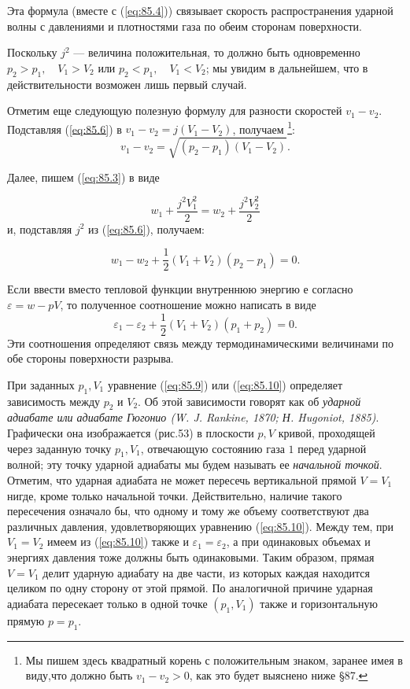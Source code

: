 Эта формула (вместе с (\ref{eq:85.4})) связывает скорость распространения ударной волны с давлениями и плотностями газа по обеим сторонам поверхности.


Поскольку $j^2$ --- величина положительная, то должно быть одновременно $p_2 >
p_1, \quad V_1 > V_2$ или $p_2 < p_1, \quad V_1 < V_2$; мы увидим в дальнейшем, что в действительности возможен лишь первый случай.

Отметим еще следующую полезную формулу для разности скоростей $v_1 - v_2$.
Подставляя (\ref{eq:85.6}) в $v_1 - v_2 = j(V_1 - V_2)$, получаем \footnote{
Мы пишем здесь квадратный корень с положительным знаком, заранее имея в виду,что должно быть $v_1-v_2>0$, как это будет выяснено ниже \S 87.
}:
\begin{equation}
	\label{eq:85.7}
	v_1 - v_2 = \sqrt{(p_2-p_1)(V_1-V_2)}.
\end{equation}

Далее, пишем (\ref{eq:85.3}) в виде


\begin{equation}
	\label{eq:85.8}
	w_1 + \frac{j^2 V^2_1}{2} = w_2 + \frac{j^2 V^2_2}{2}
\end{equation}
и, подставляя $j^2$ из (\ref{eq:85.6}), получаем:

\begin{equation}
	\label{eq:85.9}
	w_1 - w_2 + \frac{1}{2} (V_1 +V_2)(p_2-p_1) = 0.
\end{equation}

Если ввести вместо тепловой функции внутреннюю энергию е согласно $\varepsilon =
w-pV$, то полученное соотношение можно написать в виде
\begin{equation}
	\label{eq:85.10}
	\varepsilon_1 - \varepsilon_2 + \frac{1}{2} (V_1+V_2)(p_1+p_2) = 0.
\end{equation}
Эти соотношения определяют связь между термодинамическими величинами по обе
стороны поверхности разрыва.

При заданных $p_1, V_1$ уравнение (\ref{eq:85.9}) или (\ref{eq:85.10})
определяет зависимость между $p_2$ и $V_2$. Об этой зависимости говорят как об
\emph{ударной адиабате или адиабате Гюгонио (W. J. Rankine, 1870; Н. Hugoniot,
1885)}. Графически она изображается (рис.53) в плоскости $p,V$ кривой,
проходящей через заданную точку $p_1, V_1$, отвечающую состоянию газа $1$ перед
ударной волной; эту точку ударной адиабаты мы будем называть ее \emph{начальной
точкой}. Отметим, что ударная адиабата не может пересечь вертикальной прямой
$V=V_1$ нигде, кроме только начальной точки.  Действительно, наличие такого
пересечения означало бы, что одному и тому же объему соответствуют два различных
давления, удовлетворяющих уравнению (\ref{eq:85.10}). Между тем, при $V_1 = V_2$
имеем из (\ref{eq:85.10}) также и $\varepsilon_1 = \varepsilon_2$, а при
одинаковых объемах и энергиях давления тоже должны быть одинаковыми.  Таким
образом, прямая $V=V_1$ делит ударную адиабату на две части, из которых каждая
находится целиком по одну сторону от этой прямой. По аналогичной причине ударная
адиабата пересекает только в одной точке $(p_1,V_1)$ также и горизонтальную
прямую $p = p_1$.


